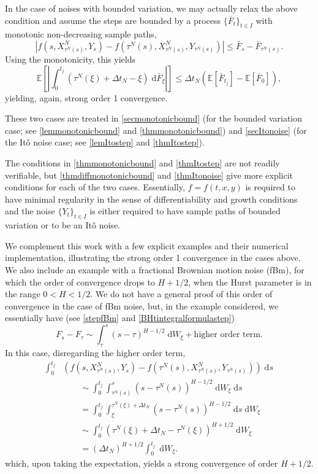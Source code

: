 \documentclass[reqno,12pt]{amsart}
\theoremstyle{plain}%
\theoremstyle{definition}
\begin{document}
In the case of noises with bounded variation, we may actually relax the above condition and assume the steps are bounded by a process $\{\bar F_t\}_{t\in I}$ with monotonic non-decreasing sample paths,
\[
    |f(s, X_{\tau^N(s)}^N, Y_s) - f(\tau^N(s), X_{\tau^N(s)}^N, Y_{\tau^N(s)})| \leq \bar F_s - \bar F_{\tau^N(s)}.
\]
Using the monotonicity, this yields
\[
    \mathbb{E}\left[\left| \int_0^{t_j} (\tau^N(\xi) + \Delta t_N - \xi) \;\mathrm{d} \bar F_\xi \right|\right] \leq \Delta t_N \left(\mathbb{E}[\bar F_{t_j}] - \mathbb{E}[\bar F_0]\right),
\]
yielding, again, strong order 1 convergence.

These two cases are treated in \cref{secmonotonicbound} (for the bounded variation case; see \cref{lemmonotonicbound} and \cref{thmmonotonicbound}) and \cref{secItonoise} (for the It\^o noise case; see \cref{lemItostep} and \cref{thmItostep}).

The conditions in \cref{thmmonotonicbound} and \cref{thmItostep} are not readily verifiable, but \cref{thmdiffmonotonicbound} and \cref{thmItonoise} give more explicit conditions for each of the two cases. Essentially, $f=f(t, x, y)$ is required to have minimal regularity in the sense of differentiability and growth conditions and the noise $\{Y_t\}_{t\in I}$ is either required to have sample paths of bounded variation or to be an It\^o noise.

We complement this work with a few explicit examples and their numerical implementation, illustrating the strong order 1 convergence in the cases above. We also include an example with a fractional Brownian motion noise (fBm), for which the order of convergence drops to $H + 1/2$, when the Hurst parameter is in the range $0 < H < 1/2$. We do not have a general proof of this order of convergence in the case of fBm noise, but, in the example considered, we essentially have (see \eqref{stepfBm} and \eqref{BHtintegralformulastep})
\[
    F_s - F_\tau \sim \int_\tau^s (s-\tau)^{H-1/2}\;\mathrm{d}W_\xi + \text{higher order term}.
\]
In this case, disregarding the higher order term,
\begin{align*}
    \int_0^{t_j} & \left( f(s, X_{\tau^N(s)}^N, Y_s) - f(\tau^N(s), X_{\tau^N(s)}^N, Y_{\tau^N(s)}) \right)\;\mathrm{d}s \\ 
    & \qquad \sim \int_0^{t_j} \int_{\tau^N(s)}^s (s-\tau^N(s))^{H-1/2} \;\mathrm{d} W_\xi\;\mathrm{d}s \\
    & \qquad = \int_0^{t_j} \int_{\xi}^{\tau^N(\xi) + \Delta t_N} (s-\tau^N(s))^{H-1/2} \;\mathrm{d}s \;\mathrm{d} W_\xi \\
    & \qquad \sim \int_0^{t_j} (\tau^N(\xi) + \Delta t_N - \tau^N(\xi))^{H+1/2} \;\mathrm{d} W_\xi \\
    & \qquad = (\Delta t_N)^{H+1/2} \int_0^{t_j} \;\mathrm{d} W_\xi.
\end{align*}
which, upon taking the expectation, yields a strong convergence of order $H + 1/2$.
\end{document}
